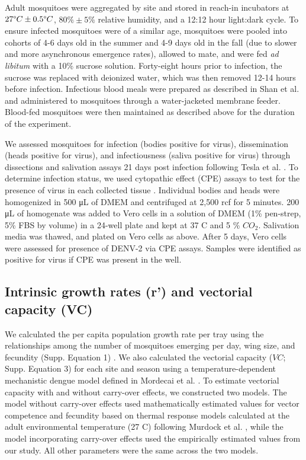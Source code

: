 \documentclass[12pt]{article}
\begin{document}
Adult mosquitoes were aggregated by site and stored in reach-in incubators at $27 \degree C \pm 0.5 \degree C$, $80\% \pm 5\%$ relative humidity, and a 12:12 hour light:dark cycle. To ensure infected mosquitoes were of a similar age, mosquitoes were pooled into cohorts of 4-6 days old in the summer and 4-9 days old in the fall (due to slower and more asynchronous emergence rates), allowed to mate, and were fed \textit{ad libitum} with a 10\% sucrose solution. Forty-eight hours prior to infection, the sucrose was replaced with deionized water, which was then removed 12-14 hours before infection. Infectious blood meals were prepared as described in Shan et al. \citep{shan2016} and administered to mosquitoes through a water-jacketed membrane feeder. Blood-fed mosquitoes were then maintained as described above for the duration of the experiment.

We assessed mosquitoes for infection (bodies positive for virus), dissemination (heads positive for virus), and infectiousness (saliva positive for virus) through dissections and salivation assays 21 days post infection following Tesla et al. \citep{tesla2017}. To determine infection status, we used cytopathic effect (CPE) assays to test for the presence of virus in each collected tissue \citep{balaya1969}. Individual bodies and heads were homogenized in 500 \si{\micro\liter} of DMEM and centrifuged at 2,500 rcf for 5 minutes. 200 \si{\micro\liter} of homogenate was added to Vero cells in a solution of DMEM (1\% pen-strep, 5\% FBS by volume) in a 24-well plate and kept at 37 \degree C and 5 \% ${CO_2}$. Salivation media was thawed, and plated on Vero cells as above. After 5 days, Vero cells were assessed for presence of DENV-2 via CPE assays. Samples were identified as positive for virus if CPE was present in the well.

\subsection{Intrinsic growth rates (r') and vectorial capacity (VC)}

We calculated the per capita population growth rate per tray using the  relationships among the number of mosquitoes emerging per day, wing size, and fecundity (Supp. Equation 1) \citep{livdahl1984}. We also calculated the vectorial capacity ($VC$; Supp. Equation 3) for each site and season using a temperature-dependent mechanistic dengue model defined in Mordecai et al. \citep{mordecai2017}. To estimate vectorial capacity with and without carry-over effects, we constructed two models. The model without carry-over effects used mathematically estimated values for vector competence and fecundity based on thermal response models calculated at the adult environmental temperature (27 \degree C) following Murdock et al. \citep{mordecai2017}, while the model incorporating carry-over effects used the empirically estimated values from our study. All other parameters were the same across the two models.
\end{document}
